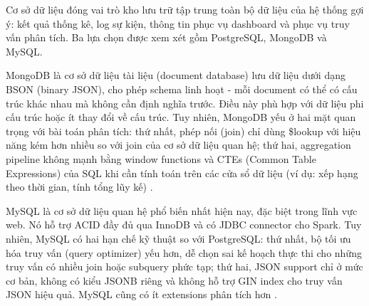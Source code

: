 \documentclass[../BTL.tex]{subfiles}
\begin{document}
\begin{table}[H]
\centering
{}
\caption{So sánh PostgreSQL với MongoDB và MySQL}
\label{tab:postgresql_compare}
\end{table}

Cơ sở dữ liệu đóng vai trò kho lưu trữ tập trung toàn bộ dữ liệu của hệ thống gợi ý: kết quả thống kê, log sự kiện, thông tin phục vụ dashboard và phục vụ truy vấn phân tích. Ba lựa chọn được xem xét gồm PostgreSQL, MongoDB và MySQL.

MongoDB là cơ sở dữ liệu tài liệu (document database) lưu dữ liệu dưới dạng BSON (binary JSON), cho phép schema linh hoạt - mỗi document có thể có cấu trúc khác nhau mà không cần định nghĩa trước. Điều này phù hợp với dữ liệu phi cấu trúc hoặc ít thay đổi về cấu trúc. Tuy nhiên, MongoDB yếu ở hai mặt quan trọng với bài toán phân tích: thứ nhất, phép nối (join) chỉ dùng \$lookup với hiệu năng kém hơn nhiều so với join của cơ sở dữ liệu quan hệ; thứ hai, aggregation pipeline không mạnh bằng window functions và CTEs (Common Table Expressions) của SQL khi cần tính toán trên các cửa sổ dữ liệu (ví dụ: xếp hạng theo thời gian, tính tổng lũy kế) \cite{postgresql_vs_mongodb_devto}.

MySQL là cơ sở dữ liệu quan hệ phổ biến nhất hiện nay, đặc biệt trong lĩnh vực web. Nó hỗ trợ ACID đầy đủ qua InnoDB và có JDBC connector cho Spark. Tuy nhiên, MySQL có hai hạn chế kỹ thuật so với PostgreSQL: thứ nhất, bộ tối ưu hóa truy vấn (query optimizer) yếu hơn, dễ chọn sai kế hoạch thực thi cho những truy vấn có nhiều join hoặc subquery phức tạp; thứ hai, JSON support chỉ ở mức cơ bản, không có kiểu JSONB riêng và không hỗ trợ GIN index cho truy vấn JSON hiệu quả. MySQL cũng có ít extensions phân tích hơn \cite{postgresql_vs_mysql_askantech}.
\end{document}
